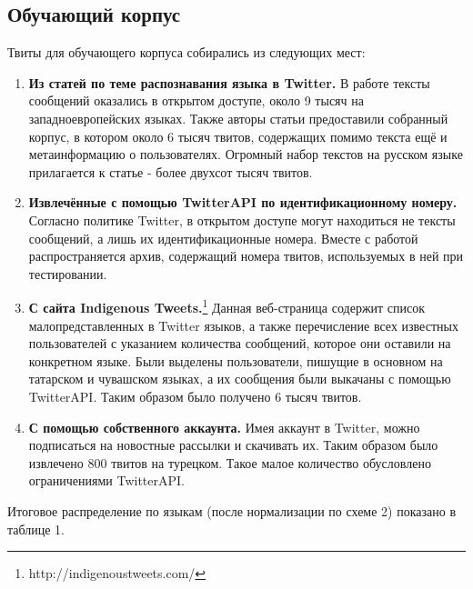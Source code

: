\documentclass[a4paper, 14pt]{article}
\begin{document}
		\subsection{Обучающий корпус}   
			Твиты для обучающего корпуса собирались из следующих мест:
			\begin{enumerate}
				\item \textbf{Из статей по теме распознавания языка в Twitter.} В работе \cite{liga} тексты сообщений оказались в открытом доступе, около 9 тысяч на западноевропейских языках. Также авторы статьи \cite{ppm} предоставили собранный корпус, в котором около 6 тысяч твитов, содержащих помимо текста ещё и метаинформацию о пользователях. Огромный набор текстов на русском языке прилагается к статье \cite{julia} - более двухсот тысяч твитов.
				\item \textbf{Извлечённые с помощью TwitterAPI по идентификационному номеру.} Согласно политике Twitter, в открытом доступе могут находиться не тексты сообщений, а лишь их идентификационные номера. Вместе с работой \cite{lrev} распространяется архив, содержащий номера твитов, используемых в ней при тестировании. 
				\item \textbf{С сайта Indigenous Tweets.}\footnote{http://indigenoustweets.com/} Данная веб-страница содержит список малопредставленных в Twitter языков, а также перечисление всех известных пользователей с указанием количества сообщений, которое они оставили на конкретном языке. Были выделены пользователи, пишущие в основном на татарском и чувашском языках, а их сообщения были выкачаны с помощью TwitterAPI. Таким образом было получено 6 тысяч твитов.
				\item \textbf{С помощью собственного аккаунта.} Имея аккаунт в Twitter, можно подписаться на новостные рассылки и скачивать их. Таким образом было извлечено 800 твитов на турецком. Такое малое количество обусловлено ограничениями TwitterAPI.
			\end{enumerate}		
			Итоговое распределение по языкам (после нормализации по схеме 2) показано в таблице 1.	  
			 
\end{document}
